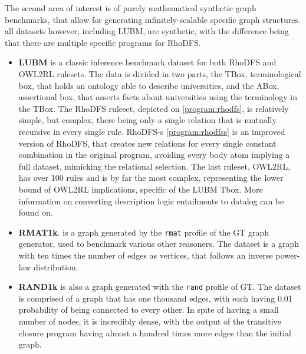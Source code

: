 \documentclass[sigconf,screen,review,natbib]{acmart}
\theoremstyle{definition}
\begin{document}
The second area of interest is of purely mathematical synthetic graph benchmarks, that allow for generating infinitely-scalable specific graph structures. all datasets however,
including LUBM\cite{lubm}, are synthetic, with the difference being that there are multiple specific programs for RhoDFS.
\begin{itemize}
	\item \textbf{LUBM} is a classic inference benchmark dataset for both RhoDFS and OWL2RL rulesets. The data is divided in two parts, the TBox, terminological box, that holds
	      an ontology able to describe universities, and the ABox, assertional box, that asserts facts about universities using the terminology in the TBox. The RhoDFS ruleset, depicted
	      on \ref{program:rhodfs}, is relatively simple, but complex, there being only a single relation that is mutually recursive in every single rule. RhoDFS-s \ref{program:rhodfss} is
	      an improved version of RhoDFS, that creates new relations for every single constant combination in the original program, avoiding every body atom implying a full dataset, mimicking
	      the relational selection. The last ruleset, OWL2RL, has over 100 rules and is by far the most complex, representing the lower bound of OWL2RL implications, specific of the LUBM
	      Tbox. More information on converting description logic entailments to datalog can be found on\cite{descr_to_dlog}.
	\item \textbf{RMAT1k}. is a graph generated by the \verb|rmat| profile of the GT\cite{gtgraph} graph generator, used to benchmark various other reasoners\cite{recstep}\cite{bigdatalog}.
	      The dataset is a graph with ten times the number of edges as vertices, that follows an inverse power-law distribution.
	\item \textbf{RAND1k} is also a graph generated with the \verb|rand| profile of GT. The dataset is comprised of a graph that has one thousand edges, with each
	      having 0.01 probability of being connected to every other. In spite of having a small number of nodes, it is incredibly dense, with the output of the transitive closure program having almost
	      a hundred times more edges than the initial graph.
\end{itemize}
\end{document}
